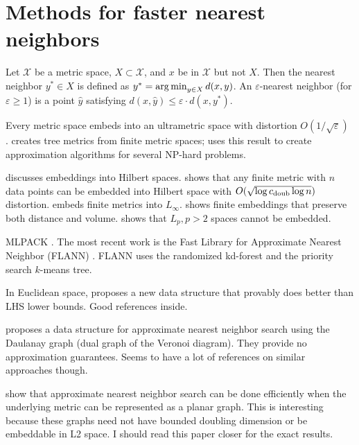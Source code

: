 \documentclass[../main.tex]{subfiles}
\newcommand{\set}[1]{\mathcal {#1}}
\newcommand{\dist}[2]{\distf({#1},{#2})}
\newcommand{\distf}{d}
\newcommand{\cdoub}{c_\textnormal{doub}}
\begin{document}

\section{Methods for faster nearest neighbors}

\begin{definition}
    Let $\set X$ be a metric space, $X\subset\set X$, and $x$ be in $\set X$ but not $X$.
    Then the nearest neighbor $y^*\in X$ is defined as $y^*=\argmin_{y\in X} \dist{x}{y}$.
    An $\varepsilon$-nearest neighbor (for $\varepsilon\ge1$) is a point $\hat y$ satisfying $\dist{x}{\hat y} \le \varepsilon \cdot\dist{x}{y^*}$.
\end{definition}
\newcommand{\eann}{(1+\varepsilon)\text{-ann}}

Every metric space embeds into an ultrametric space with distortion $O(1/\sqrt \varepsilon)$ \citep{abraham2007embedding}.
\cite{charikar1998approximating} creates tree metrics from finite metric spaces;
uses this result to create approximation algorithms for several NP-hard problems.

\cite{bartal2003metric} discusses embeddings into Hilbert spaces.
\cite{krauthgamer2004measured} shows that any finite metric with $n$ data points can be embedded into Hilbert space with $O(\sqrt{\log\cdoub\log n})$ distortion.
\cite{neiman2016low} embeds finite metrics into $L_\infty$.
\cite{abraham2014volume} shows finite embeddings that preserve both distance and volume.
\cite{bartal2015impossibility} shows that $L_p, p>2$ spaces cannot be embedded.

MLPACK \cite{curtin2013mlpack}.
The most recent work is the Fast Library for Approximate Nearest Neighbor (FLANN) \cite{muja2014scalable}.
FLANN uses the randomized kd-forest and the priority search $k$-means tree.

In Euclidean space, \cite{andoni2014beyond} proposes a new data structure that provably does better than LHS lower bounds.
Good references inside.

\cite{malkov2014approximate} proposes a data structure for approximate nearest neighbor search using the Daulanay graph (dual graph of the Veronoi diagram).
They provide no approximation guarantees.
Seems to have a lot of references on similar approaches though.

\cite{abraham2015approximate} show that approximate nearest neighbor search can be done efficiently when the underlying metric can be represented as a planar graph.
This is interesting because these graphs need not have bounded doubling dimension or be embeddable in L2 space.
I should read this paper closer for the exact results.
\end{document}
